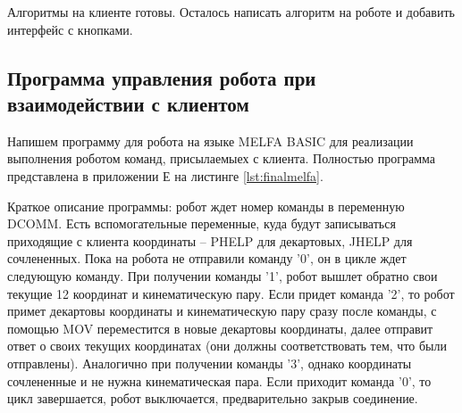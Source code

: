 \documentclass[a4paper,14pt]{extarticle}
\begin{document}
Алгоритмы на клиенте готовы. Осталось написать алгоритм на роботе
и добавить интерфейс с кнопками.


\subsection{Программа управления робота при взаимодействии с клиентом}
Напишем программу для робота на языке MELFA BASIC для реализации
выполнения роботом команд, присылаемыех с клиента. Полностью программа
представлена в приложении Е на листинге \ref{lst:finalmelfa}.


Краткое описание программы: робот ждет номер команды в переменную DCOMM.
Есть вспомогательные переменные, куда будут записываться приходящие с клиента
координаты -- PHELP для декартовых, JHELP для сочлененных. Пока на робота не отправили
команду '0', он в цикле ждет следующую команду. При получении команды '1', робот
вышлет обратно свои текущие 12 координат и кинематическую пару. Если придет команда '2',
то робот примет декартовы координаты и кинематическую пару сразу после команды, с помощью MOV переместится
в новые декартовы координаты, далее отправит ответ о своих текущих координатах (они должны
соответствовать тем, что были отправлены). Аналогично при получении команды '3', однако
координаты сочлененные и не нужна кинематическая пара. Если приходит команда '0', то
цикл завершается, робот выключается, предварительно закрыв соединение.


\appendix
\renewcommand{\thesection}{\Asbuk{section}}
\end{document}
